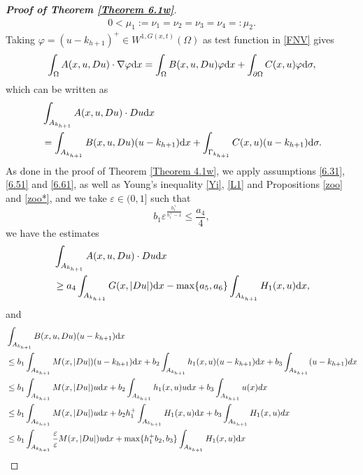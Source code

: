 \documentclass[10pt,reqno]{amsart}
\newcommand *\w{^\wedge}
\theoremstyle{definition}
\numberwithin{equation}{section}
\begin{document}
\begin{proof}[\textbf{Proof of Theorem \ref{Theorem 6.1w}}]
\begin{align*}
		0<\mu_1:=\nu_1=\nu_2=\nu_3=\nu_4=:\mu_2.
	\end{align*}
	Taking $\varphi =(u-k_{h+1})^{+} \in W^{1,G(x,t)}(\Omega)$ as test function in \eqref{FNV} gives
	\begin{align*}
		\int_{\Omega}
		A(x,u,D u) \cdot \nabla
		\varphi {\rm d}x =\int_{\Omega }B(x,u,D u)\varphi {\rm d}x+\int_{\partial\Omega}C(x,u)\varphi {\rm d}\sigma,
	\end{align*}
	which can be written as
	\begin{align}\label{estimate_311}
		\begin{split}
			&\int_{A_{k_{h+1}}} A(x,u,D u) \cdot D u {\rm d}x\\ 
			&=\int_{A_{k_{h+1}} }B(x,u,D u)(u-k_{h+1}) {\rm d}x +\int_{\Gamma_{k_{h+1}} }C(x,u)(u-k_{h+1}) {\rm d} \sigma.
		\end{split}
	\end{align}
	As done in the proof of Theorem \ref{Theorem 4.1w}, we apply assumptions \eqref{6.31}, \eqref{6.51} and \eqref{6.61}, as well as Young's inequality \eqref{Yi}, \eqref{L1} and Propositions \ref{zoo} and \ref{zoo*}, and we take $\varepsilon \in (0,1]$ such that
    $$b_1\varepsilon^{\frac{h_1^+}{h_1^+-1}}\leq\frac{a_4}{4},$$
  we have the estimates
	\begin{align}\label{estimate_411}
		\begin{split}
			&\int_{A_{k_{h+1}}} A(x,u,D u)\cdot D u {\rm d}x\\
			&\geq a_4\int_{A_{k_{h+1}} }G(x,|D u|) {\rm d}x-\max\{a_5,a_6\}\int_{A_{k_{h+1}} }H_1(x,u){\rm d}x,
		\end{split}
	\end{align}
	and
	\begin{align}\label{estimate_511}
		\begin{split}
			&\int_{A_{k_{h+1}}} B(x,u,D u)(u-k_{h+1}){\rm d}x\\
            & \leq b_1\int_{A_{k_{h+1}}}  M(x,|D u|)(u-k_{h+1}) {\rm d}x + b_2 \int_{A_{k_{h+1}}}  h_1(x, u) (u-k_{h+1}){\rm d}x+ b_3\int_{A_{k_{h+1}}} (u-k_{h+1}) d x\\
            & \leq b_1\int_{A_{k_{h+1}}}  M(x,|D u|)u {\rm d}x + b_2 \int_{A_{k_{h+1}}}  h_1(x, u) u{\rm d}x+b_3\int_{A_{k_{h+1}}}  u(x) d x\\
             & \leq b_1\int_{A_{k_{h+1}}}  M(x,|D u|)u {\rm d}x + b_2 h_1^+\int_{A_{k_{h+1}}}  H_1(x, u) {\rm d}x+b_3\int_{A_{k_{h+1}}}  H_1(x,u) d x\\
			& \leq b_1\int_{A_{k_{h+1}} }\frac{\varepsilon}{\varepsilon}M(x,|D u|)u{\rm d}x+\max\{h_1^+b_2,b_3\}\int_{A_{k_{h+1}}}H_1(x,u){\rm d}x \\

\end{split}
\end{align}
\end{proof}
\end{document}
